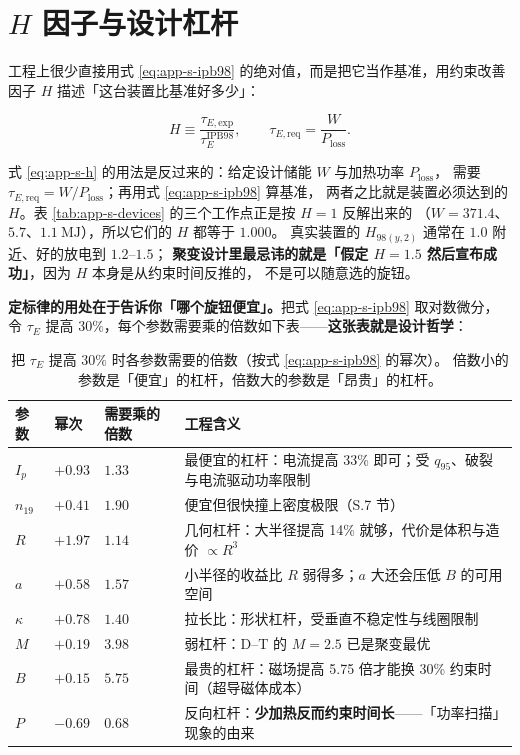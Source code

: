 \section{\texorpdfstring{$H$}{H} 因子与设计杠杆}
\label{sec:app-s-h}

工程上很少直接用式 \eqref{eq:app-s-ipb98} 的绝对值，而是把它当作基准，用约束改善因子 $H$
描述「这台装置比基准好多少」：

\begin{equation}
H\equiv\frac{\tau_{E,\mathrm{exp}}}{\tau_E^{\mathrm{IPB98}}},
\qquad
\tau_{E,\mathrm{req}}=\frac{W}{P_{\mathrm{loss}}} .
\label{eq:app-s-h}
\end{equation}

式 \eqref{eq:app-s-h} 的用法是反过来的：给定设计储能 $W$ 与加热功率 $P_{\mathrm{loss}}$，
需要 $\tau_{E,\mathrm{req}}=W/P_{\mathrm{loss}}$；再用式 \eqref{eq:app-s-ipb98} 算基准，
两者之比就是装置必须达到的 $H$。表 \ref{tab:app-s-devices} 的三个工作点正是按 $H=1$ 反解出来的
（$W=371.4$、$5.7$、$1.1\ \mathrm{MJ}$），所以它们的 $H$ 都等于 $1.000$。
真实装置的 $H_{98(y,2)}$ 通常在 $1.0$ 附近、好的放电到 $1.2$--$1.5$；
\textbf{聚变设计里最忌讳的就是「假定 $H=1.5$ 然后宣布成功」}，因为 $H$ 本身是从约束时间反推的，
不是可以随意选的旋钮。

\textbf{定标律的用处在于告诉你「哪个旋钮便宜」。}把式 \eqref{eq:app-s-ipb98} 取对数微分，
令 $\tau_E$ 提高 $30\%$，每个参数需要乘的倍数如下表——\textbf{这张表就是设计哲学}：

\begin{table}[htbp]
  \centering
  \caption{把 $\tau_E$ 提高 $30\%$ 时各参数需要的倍数（按式 \eqref{eq:app-s-ipb98} 的幂次）。
    倍数小的参数是「便宜」的杠杆，倍数大的参数是「昂贵」的杠杆。}
  \label{tab:app-s-lever}
  \begin{tabular}{@{}p{1.6cm}p{1.6cm}p{3.0cm}p{8.0cm}@{}}
    \toprule
    参数 & 幂次 & 需要乘的倍数 & 工程含义 \\
    \midrule
    $I_p$ & $+0.93$ & $1.33$ & 最便宜的杠杆：电流提高 33\% 即可；受 $q_{95}$、破裂与电流驱动功率限制 \\
    $n_{19}$ & $+0.41$ & $1.90$ & 便宜但很快撞上密度极限（S.7 节）\\
    $R$ & $+1.97$ & $1.14$ & 几何杠杆：大半径提高 14\% 就够，代价是体积与造价 $\propto R^3$ \\
    $a$ & $+0.58$ & $1.57$ & 小半径的收益比 $R$ 弱得多；$a$ 大还会压低 $B$ 的可用空间 \\
    $\kappa$ & $+0.78$ & $1.40$ & 拉长比：形状杠杆，受垂直不稳定性与线圈限制 \\
    $M$ & $+0.19$ & $3.98$ & 弱杠杆：D--T 的 $M=2.5$ 已是聚变最优 \\
    $B$ & $+0.15$ & $5.75$ & 最贵的杠杆：磁场提高 5.75 倍才能换 30\% 约束时间（超导磁体成本）\\
    $P$ & $-0.69$ & $0.68$ & 反向杠杆：\textbf{少加热反而约束时间长}——「功率扫描」现象的由来 \\
    \bottomrule
  \end{tabular}
\end{table}

